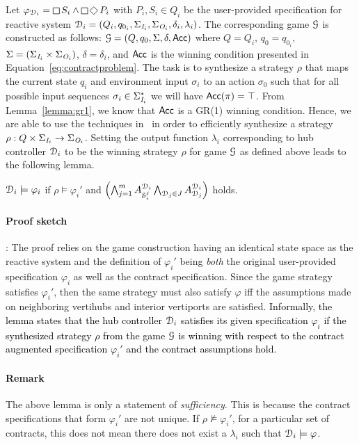 Let $\varphi_{\design_i} = \LTLglobally S_i \wedge \LTLglobally \LTLfinally P_i$ with $P_i,S_i \in Q_i$ be the user-provided specification for reactive system $\mathcal{D}_i = (Q_i,q_{0_i},\Sigma_{\textit{I}_{i}},\Sigma_{\textit{O}_{i}},\delta_i,\lambda_i)$. The corresponding game $\mathcal{G}$ is constructed as follows: $\mathcal{G} = \left(Q,q_0, \Sigma, \delta,\mathsf{Acc} \right)$
where $Q = Q_i$, $q_{0} = q_{0_i}$, $\Sigma = (\Sigma_{\textit{I}_{i}} \times \Sigma_{\textit{O}_{i}})$, $\delta = \delta_i$, and $\mathsf{Acc}$ is the winning condition presented in Equation~\eqref{eq:contractproblem}. 
The task is to synthesize a strategy $\rho$ that maps the current state $q_i$ and environment input $\sigma_i$ to an action $\sigma_0$ such that for all possible input sequences $\sigma_i \in \Sigma_{\textit{I}_{i}}^*$ we will have $\mathsf{Acc}(\pi) = \top$.
From Lemma~\ref{lemma:gr1}, we know that $\mathsf{Acc}$ is a GR(1) winning condition. Hence, we are able to use the techniques in~\cite{bloem2012} in order to efficiently synthesize a strategy $\rho: Q\times\Sigma_{\textit{I}_{i}} \rightarrow \Sigma_{\textit{O}_{i}}$. Setting the output function $\lambda_i$ corresponding to hub controller $\mathcal{D}_i$ to be the winning strategy $\rho$ for game $\mathcal{G}$ as defined above  leads to the following lemma. 
\begin{lemma}
$\mathcal{D}_i \models \varphi_i$ if $\rho \models \varphi_i'$ and $ \left(\bigwedge_{j=1}^m A_{\mathcal{S}_i^j}^{\mathcal{D}_i} \bigwedge_{\mathcal{D}_j\in J} A_{\mathcal{D}_j}^{\mathcal{D}_i} \right)$ holds. 
\end{lemma}
\paragraph{Proof sketch}:
The proof relies on the game construction having an identical state space as the reactive system and the definition of $\varphi_i'$ being \emph{both} the original user-provided specification $\varphi_i$ as well as the contract specification. Since the game strategy satisfies $\varphi_i'$, then the same strategy must also satisfy $\varphi$ iff the assumptions made on neighboring vertihubs and interior vertiports are satisfied.
\textcolor{black}{Informally, the lemma states that the hub controller $\mathcal{D}_i$ satisfies its given specification $\varphi_i$ if the synthesized strategy $\rho$ from the game $\mathcal{G}$ is winning with respect to the contract augmented specification $\varphi_i'$ and the contract assumptions hold.}
\paragraph*{\textbf{Remark}} The above lemma is only a statement of \emph{sufficiency}. This is because the contract specifications that form $\varphi_i'$ are not unique. If $\rho \nvDash \varphi_i'$, for a particular set of contracts, this does not mean there does not exist a $\lambda_i$ such that $\mathcal{D}_i \models \varphi$.




